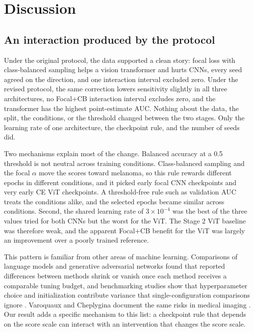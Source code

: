 \documentclass[11pt]{article}
\begin{document}
\section{Discussion}

\subsection{An interaction produced by the protocol}

Under the original protocol, the data supported a clean story: focal loss with class-balanced sampling helps a vision transformer and hurts CNNs, every seed agreed on the direction, and one interaction interval excluded zero. Under the revised protocol, the same correction lowers sensitivity slightly in all three architectures, no Focal+CB interaction interval excludes zero, and the transformer has the highest point-estimate AUC. Nothing about the data, the split, the conditions, or the threshold changed between the two stages. Only the learning rate of one architecture, the checkpoint rule, and the number of seeds did.

Two mechanisms explain most of the change. Balanced accuracy at a 0.5 threshold is not neutral across training conditions. Class-balanced sampling and the focal $\alpha$ move the scores toward melanoma, so this rule rewards different epochs in different conditions, and it picked early focal CNN checkpoints and very early CE ViT checkpoints. A threshold-free rule such as validation AUC treats the conditions alike, and the selected epochs became similar across conditions. Second, the shared learning rate of $3\times10^{-4}$ was the best of the three values tried for both CNNs but the worst for the ViT. The Stage 2 ViT baseline was therefore weak, and the apparent Focal+CB benefit for the ViT was largely an improvement over a poorly trained reference.

This pattern is familiar from other areas of machine learning. Comparisons of language models \citep{melis2018evaluation} and generative adversarial networks \citep{lucic2018gans} found that reported differences between methods shrink or vanish once each method receives a comparable tuning budget, and benchmarking studies show that hyperparameter choice and initialization contribute variance that single-configuration comparisons ignore \citep{bouthillier2021variance,dodge2019showyourwork}. Varoquaux and Cheplygina document the same risks in medical imaging \citep{varoquaux2022failures}. Our result adds a specific mechanism to this list: a checkpoint rule that depends on the score scale can interact with an intervention that changes the score scale.
\end{document}

